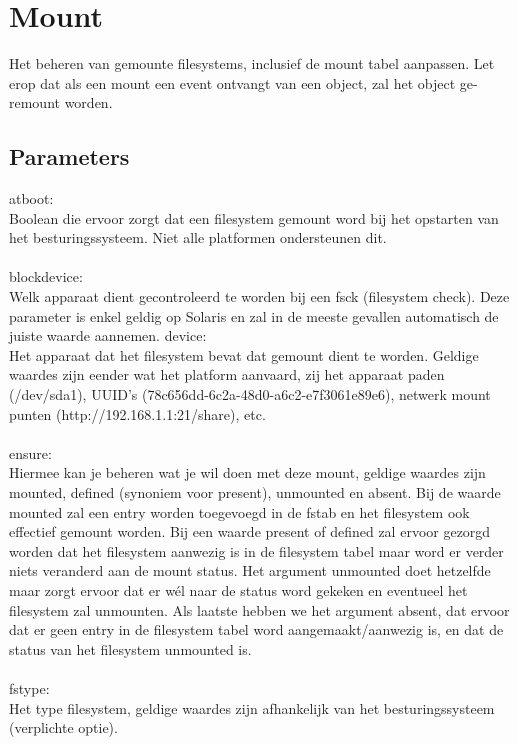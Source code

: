 \section{Mount}

Het beheren van gemounte filesystems, inclusief de mount tabel aanpassen. Let erop dat als een mount een event ontvangt van een object, zal het object ge-remount worden.

\subsection{Parameters}

atboot:\\
Boolean die ervoor zorgt dat een filesystem gemount word bij het opstarten van het besturingssysteem. Niet alle platformen ondersteunen dit.\\\\
%
blockdevice:\\
Welk apparaat dient gecontroleerd te worden bij een fsck (filesystem check). Deze parameter is enkel geldig op Solaris en zal in de meeste gevallen automatisch de juiste waarde aannemen.
%
device:\\
Het apparaat dat het filesystem bevat dat gemount dient te worden. Geldige waardes zijn eender wat het platform aanvaard, zij het apparaat paden (/dev/sda1), UUID's (78c656dd-6c2a-48d0-a6c2-e7f3061e89e6), netwerk mount punten (http://192.168.1.1:21/share), etc.\\\\
%
ensure:\\
Hiermee kan je beheren wat je wil doen met deze mount, geldige waardes zijn mounted, defined (synoniem voor present), unmounted en absent. Bij de waarde mounted zal een entry worden toegevoegd in de fstab en het filesystem ook effectief gemount worden. Bij een waarde present of defined zal ervoor gezorgd worden dat het filesystem aanwezig is in de filesystem tabel maar word er verder niets veranderd aan de mount status. Het argument unmounted doet hetzelfde maar zorgt ervoor dat er w\'el naar de status word gekeken en eventueel het filesystem zal unmounten. Als laatste hebben we het argument absent, dat ervoor dat er geen entry in de filesystem tabel word aangemaakt/aanwezig is, en dat de status van het filesystem unmounted is.\\\\
%
fstype:\\
Het type filesystem, geldige waardes zijn afhankelijk van het besturingssysteem (verplichte optie).\\\\
